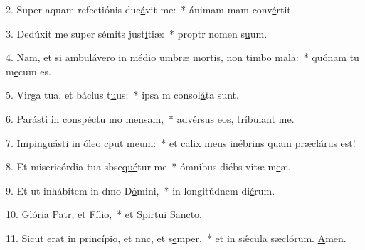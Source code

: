 2. Super aquam refectiónis duc\uline{á}vit me:~* ánimam mam conv\uline{é}rtit.\par 
3. Dedúxit me super sémits just\uline{í}tiæ:~* proptr nomen s\uline{u}um.\par 
4. Nam, et si ambulávero in médio umbræ mortis, non timbo m\uline{a}la:~* quónam tu m\uline{e}cum es.\par 
5. Virga tua, et báclus t\uline{u}us:~* ipsa m consol\uline{á}ta sunt.\par 
6. Parásti in conspéctu mo m\uline{e}nsam,~* advérsus eos,  tríbul\uline{a}nt me.\par 
7. Impinguásti in óleo cput m\uline{e}um:~* et calix meus inébrins quam præcl\uline{á}rus est!\par 
8. Et misericórdia tua sbse\uline{qué}tur me~* ómnibus diébs vitæ m\uline{e}æ.\par 
9. Et ut inhábitem in dmo D\uline{ó}mini,~* in longitúdnem di\uline{é}rum.\par 
10. Glória Patr, et F\uline{í}lio,~* et Spirtui S\uline{a}ncto.\par 
11. Sicut erat in princípio, et nnc, et s\uline{e}mper,~* et in sǽcula sæclórum. \uline{A}men.\par 
